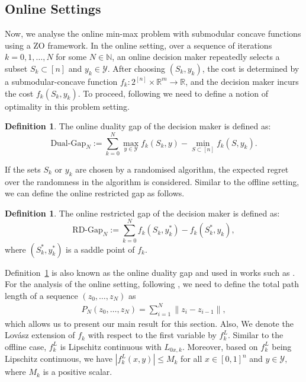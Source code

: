 \documentclass{article}
\theoremstyle{plain}
\theoremstyle{definition}
\newtheorem{definition}[theorem]{Definition}
\theoremstyle{remark}
\newcommand{\R}{\mathbb{R}}
\newcommand{\N}{\mathbb{N}}
\begin{document}
\subsection{Online Settings}\label{sec:mainon}
Now, we analyse the online min-max problem with submodular concave functions using a ZO framework. 
In the online setting, over a sequence of iterations $k=0,1,\dots,N$ for some $N\in \N$, 
an online decision maker repeatedly selects a subset \( S_k \subset [n] \) and $y_k\in\mathcal{Y}$.
After choosing \( (S_k,y_k) \), the cost is determined by a submodular-concave function \( f_k : 2^{[n]}\times\R^m \rightarrow \mathbb{R} \), and the decision maker incurs the cost \( f_k(S_k,y_k) \). To proceed,
following \cite{zhang2022no} we need to define a notion of optimality in this problem setting.
\begin{definition}\label{def:on_dp}
The online duality gap of the decision maker is defined as:
\[
\text{Dual-Gap}_N := \sum_{k=0}^N \max_{y\in\mathcal{Y}}f_k(S_k,y) - \min_{S \subset [n]} %
f_k(S,y_k).
\]
\end{definition}
If the sets \( S_k \) or \(y_k\) are chosen by a randomised algorithm, the expected regret over the randomness in the algorithm is considered. Similar to the offline setting, we can define the online restricted gap as follows. %
\begin{definition}\label{def:on_rdp}
The online restricted gap of the decision maker is defined as:
\[
\text{RD-Gap}_N := \sum_{k=0}^N f_k(S_k,y^\ast_k) - f_k(S^\ast_k,y_k),
\]
where $(S^\ast_k,y^\ast_k)$ is a
saddle point of $f_k$.
\end{definition}
Definition~\ref{def:on_rdp} is also known as the online duality gap and used in works such as \cite{meng2025modular}.
For the analysis of the online setting, following \cite{zinkevich2003online}, we need to define the total path length of a sequence $(z_0,\dots,z_N)$ as
\begin{align}\label{eq:pathl}
    P_N(z_0,\dots,z_N)=\sum_{i=1}^N\|z_i-z_{i-1}\|,
\end{align}
which allows us to present our main result for this section.
Also, We denote the Lovász extension of $f_k$ with respect to the first variable by $f^L_k.$ Similar to the offline case, $f^L_k$ is Lipschitz continuous with $L_{0x,k}$. Moreover, based on $f^L_k$ being Lipschitz continuous, we have $|f^L_k(x,y)|\leq M_k$ for all $x\in[0,1]^n$ and $y\in\mathcal{Y},$ where $M_k$ is a positive scalar.
\end{document}
